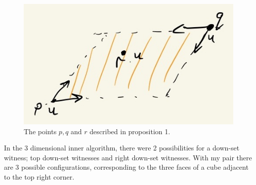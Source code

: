 \documentclass{article}
\begin{document}
  \begin{figure}[htbp]
    \centerline{\includegraphics[scale=.5]{notes-21.jpg}}
    \caption{The points $p, q$ and $r$ described in proposition 1.}
  \end{figure}

  In the 3 dimensional inner algorithm, there were 2 possibilities for a down-set witness; top
  down-set witnesses and right down-set witnesses. With my pair there are 3 possible configurations,
  corresponding to the three faces of a cube adjacent to the top right corner. 

  
  
\end{document}
